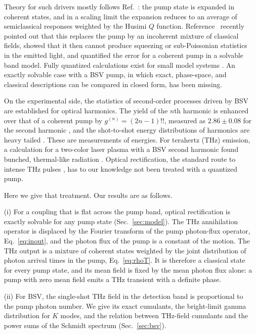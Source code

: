 \documentclass[aps,pra,reprint,superscriptaddress,amsmath,amssymb,floatfix]{revtex4-2}
\begin{document}
Theory for such drivers mostly follows Ref.~\cite{gorlach2023}: the pump state
is expanded in coherent states, and in a scaling limit the expansion reduces
to an average of semiclassical responses weighted by the Husimi $Q$ function.
Reference~\cite{gothelf2026} recently pointed out that this replaces the pump
by an incoherent mixture of classical fields, showed that it then cannot
produce squeezing or sub-Poissonian statistics in the emitted light, and
quantified the error for a coherent pump in a solvable band model. Fully
quantized calculations exist for small model systems \cite{delapena2026}. An
exactly solvable case with a BSV pump, in which exact, phase-space, and
classical descriptions can be compared in closed form, has been missing.

On the experimental side, the statistics of second-order processes driven by
BSV are established for optical harmonics. The yield of the $n$th harmonic is
enhanced over that of a coherent pump by $g^{(n)}=(2n-1)!!$, measured as
$2.86\pm0.08$ for the second harmonic \cite{spasibko2017}, and the shot-to-shot
energy distributions of harmonics are heavy tailed \cite{manceau2019}. These
are measurements of energies. For terahertz (THz) emission, a calculation for
a two-color laser plasma with a BSV second harmonic found bunched,
thermal-like radiation \cite{wangthz2026}. Optical rectification, the standard
route to intense THz pulses \cite{ravi2014}, has to our knowledge not been
treated with a quantized pump.

Here we give that treatment. Our results are as follows.

(i) For a coupling that is flat across the pump band, optical rectification is
exactly solvable for any pump state (Sec.~\ref{sec:model}). The THz
annihilation operator is displaced by the Fourier transform of the pump
photon-flux operator, Eq.~\eqref{eq:inout}, and the photon flux of the pump is
a constant of the motion. The THz output is a mixture of coherent states
weighted by the joint distribution of photon arrival times in the pump,
Eq.~\eqref{eq:rhoT}. It is therefore a classical state for every pump state,
and its mean field is fixed by the mean photon flux alone: a pump with zero
mean field emits a THz transient with a definite phase.

(ii) For BSV, the single-shot THz field in the detection band is proportional
to the pump photon number. We give its exact cumulants, the bright-limit gamma
distribution for $K$ modes, and the relation between THz-field cumulants and
the power sums of the Schmidt spectrum (Sec.~\ref{sec:bsv}).
\end{document}
